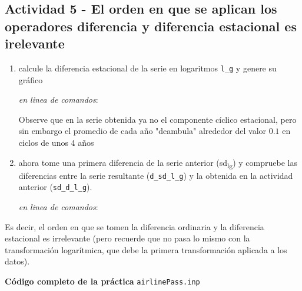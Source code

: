 \documentclass[11pt]{article}
\begin{document}
\subsection{Actividad 5 - El orden en que se aplican los operadores diferencia y diferencia estacional es irelevante}
\label{sec:org8f2033a}

\begin{enumerate}
\item calcule la diferencia estacional de la serie en logaritmos \texttt{l\_g} y
genere su gráfico

{\vspace{0pt} \footnotesize \color{gray!70!black}
\emph{en linea de comandos}: 
}

Observe que en la serie obtenida ya no el componente cíclico
estacional, pero sin embargo el promedio de cada año "deambula"
alrededor del valor \(0.1\) en ciclos de unos 4 años

\item ahora tome una primera diferencia de la serie anterior (sd\textsubscript{l}\textsubscript{g}) y
compruebe las diferencias entre la serie resultante (\texttt{d\_sd\_l\_g}) y
la obtenida en la actividad anterior (\texttt{sd\_d\_l\_g}).

{\vspace{0pt} \footnotesize \color{gray!70!black}
\emph{en linea de comandos}: 
}
\end{enumerate}

Es decir, el orden en que se tomen la diferencia ordinaria y la
diferencia estacional es irrelevante (pero recuerde que no pasa lo
mismo con la transformación logarítmica, que debe la primera
transformación aplicada a los datos).

\vspace{10pt}
\noindent
\textbf{Código completo de la práctica} \texttt{airlinePass.inp}
\vspace{10pt}

\clearpage
\end{document}
